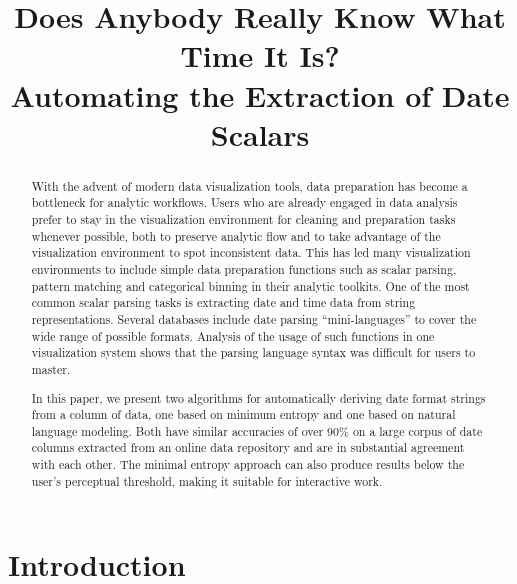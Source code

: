 \documentclass{acm_proc_article-sp}
\begin{document}

\title{Does Anybody Really Know What Time It Is?\\
Automating the Extraction of Date Scalars}


\maketitle
\begin{abstract}
With the advent of modern data visualization tools, data preparation has become a bottleneck for analytic workflows. Users who are already engaged in data analysis prefer to stay in the visualization environment for cleaning and preparation tasks whenever possible, both to preserve analytic flow and to take advantage of the visualization environment to spot inconsistent data. This has led many visualization environments to include simple data preparation functions such as scalar parsing, pattern matching and categorical binning in their analytic toolkits. One of the most common scalar parsing tasks is extracting date and time data from string representations. Several databases include date parsing ``mini-languages'' to cover the wide range of possible formats. Analysis of the usage of such functions in one visualization system shows that the parsing language syntax was difficult for users to master. 

In this paper, we present two algorithms for automatically deriving date format strings from a column of data, one based on minimum entropy and one based on natural language modeling. Both have similar accuracies of over 90\% on a large corpus of date columns extracted from an online data repository and are in substantial agreement with each other. The minimal entropy approach can also produce results below the user's perceptual threshold, making it suitable for interactive work.
\end{abstract}



\section{Introduction}

\end{document}
